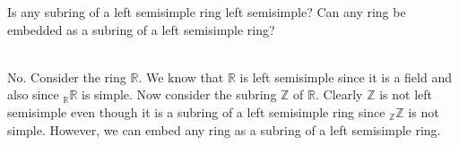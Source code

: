 Is any subring of a left semisimple ring left semisimple? Can any ring be embedded as a subring of
a left semisimple ring?\\

\begin{solution}\renewcommand{\qedsymbol}{}\ \\
    No. Consider the ring $\mathbb{R}$. We know that $\mathbb{R}$ is left semisimple since it is a field
    and also since $_{\mathbb{R}}\mathbb{R}$ is simple. Now consider the subring $\mathbb{Z}$ of
    $\mathbb{R}$. Clearly $\mathbb{Z}$ is not left semisimple even though it is a subring of a left
    semisimple ring since $_{\mathbb{Z}}\mathbb{Z}$ is not simple. However, we can embed any ring as a
    subring of a left semisimple ring.

\end{solution}